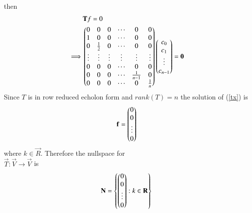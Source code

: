 \documentclass[journal,12pt,twocolumn]{IEEEtran}
\begin{document}
\begin{enumerate}[label=\emph{\alph*)}]
                then
\begin{align}
	&\vec{T}f=0 \\
	\implies 
	&\myvec{0 & 0 & 0 & \cdots & 0 & 0\\
               1 & 0 & 0 & \cdots & 0 & 0\\
               0 & \frac{1}{2} & 0 & \cdots & 0 & 0\\
               \vdots & \vdots & \vdots & \vdots & \vdots & \vdots\\
               0 & 0 & 0 & \cdots & 0 & 0 \\
               0 & 0 & 0 & \cdots & \frac{1}{n-1} & 0 \\
               0 & 0 & 0 & \cdots & 0 & \frac{1}{n} }
	       \myvec{c_0\\c_1\\\vdots\\c_{n-1}}=\vec{0} \label{tx}
\end{align}
Since $T$ is in row reduced echolon form and $rank(T)=n$ the solution of (\ref{tx}) is
\begin{align}
\mathbf{f}=\begin{pmatrix}0\\0\\\vdots\\0\end{pmatrix}
\end{align}
where $k \in \vec{R}$. Therefore the nullspace for \\$\vec{T}:\vec{V}\rightarrow\vec{V}$ is
\begin{align}
        \mathbf{N}=\left\{\begin{pmatrix}0\\0\\\vdots\\0\end{pmatrix}:k \in \mathbf{R}\right\}
\end{align}
\end{enumerate}
\end{document}
